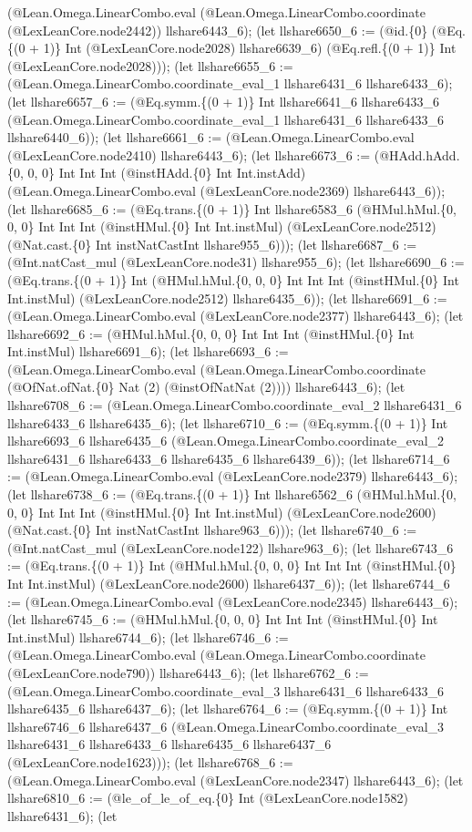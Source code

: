 \documentclass[11pt]{article}
\begin{document}
(@Lean.Omega.LinearCombo.eval (@Lean.Omega.LinearCombo.coordinate (@LexLeanCore.node2442)) llshare6443\_6); (let llshare6650\_6 := (@id.\{0\} (@Eq.\{(0 + 1)\} Int (@LexLeanCore.node2028) llshare6639\_6) (@Eq.refl.\{(0 + 1)\} Int (@LexLeanCore.node2028))); (let llshare6655\_6 := (@Lean.Omega.LinearCombo.coordinate\_eval\_1 llshare6431\_6 llshare6433\_6); (let llshare6657\_6 := (@Eq.symm.\{(0 + 1)\} Int llshare6641\_6 llshare6433\_6 (@Lean.Omega.LinearCombo.coordinate\_eval\_1 llshare6431\_6 llshare6433\_6 llshare6440\_6)); (let llshare6661\_6 := (@Lean.Omega.LinearCombo.eval (@LexLeanCore.node2410) llshare6443\_6); (let llshare6673\_6 := (@HAdd.hAdd.\{0, 0, 0\} Int Int Int (@instHAdd.\{0\} Int Int.instAdd) (@Lean.Omega.LinearCombo.eval (@LexLeanCore.node2369) llshare6443\_6)); (let llshare6685\_6 := (@Eq.trans.\{(0 + 1)\} Int llshare6583\_6 (@HMul.hMul.\{0, 0, 0\} Int Int Int (@instHMul.\{0\} Int Int.instMul) (@LexLeanCore.node2512) (@Nat.cast.\{0\} Int instNatCastInt llshare955\_6))); (let llshare6687\_6 := (@Int.natCast\_mul (@LexLeanCore.node31) llshare955\_6); (let llshare6690\_6 := (@Eq.trans.\{(0 + 1)\} Int (@HMul.hMul.\{0, 0, 0\} Int Int Int (@instHMul.\{0\} Int Int.instMul) (@LexLeanCore.node2512) llshare6435\_6)); (let llshare6691\_6 := (@Lean.Omega.LinearCombo.eval (@LexLeanCore.node2377) llshare6443\_6); (let llshare6692\_6 := (@HMul.hMul.\{0, 0, 0\} Int Int Int (@instHMul.\{0\} Int Int.instMul) llshare6691\_6); (let llshare6693\_6 := (@Lean.Omega.LinearCombo.eval (@Lean.Omega.LinearCombo.coordinate (@OfNat.ofNat.\{0\} Nat (2) (@instOfNatNat (2)))) llshare6443\_6); (let llshare6708\_6 := (@Lean.Omega.LinearCombo.coordinate\_eval\_2 llshare6431\_6 llshare6433\_6 llshare6435\_6); (let llshare6710\_6 := (@Eq.symm.\{(0 + 1)\} Int llshare6693\_6 llshare6435\_6 (@Lean.Omega.LinearCombo.coordinate\_eval\_2 llshare6431\_6 llshare6433\_6 llshare6435\_6 llshare6439\_6)); (let llshare6714\_6 := (@Lean.Omega.LinearCombo.eval (@LexLeanCore.node2379) llshare6443\_6); (let llshare6738\_6 := (@Eq.trans.\{(0 + 1)\} Int llshare6562\_6 (@HMul.hMul.\{0, 0, 0\} Int Int Int (@instHMul.\{0\} Int Int.instMul) (@LexLeanCore.node2600) (@Nat.cast.\{0\} Int instNatCastInt llshare963\_6))); (let llshare6740\_6 := (@Int.natCast\_mul (@LexLeanCore.node122) llshare963\_6); (let llshare6743\_6 := (@Eq.trans.\{(0 + 1)\} Int (@HMul.hMul.\{0, 0, 0\} Int Int Int (@instHMul.\{0\} Int Int.instMul) (@LexLeanCore.node2600) llshare6437\_6)); (let llshare6744\_6 := (@Lean.Omega.LinearCombo.eval (@LexLeanCore.node2345) llshare6443\_6); (let llshare6745\_6 := (@HMul.hMul.\{0, 0, 0\} Int Int Int (@instHMul.\{0\} Int Int.instMul) llshare6744\_6); (let llshare6746\_6 := (@Lean.Omega.LinearCombo.eval (@Lean.Omega.LinearCombo.coordinate (@LexLeanCore.node790)) llshare6443\_6); (let llshare6762\_6 := (@Lean.Omega.LinearCombo.coordinate\_eval\_3 llshare6431\_6 llshare6433\_6 llshare6435\_6 llshare6437\_6); (let llshare6764\_6 := (@Eq.symm.\{(0 + 1)\} Int llshare6746\_6 llshare6437\_6 (@Lean.Omega.LinearCombo.coordinate\_eval\_3 llshare6431\_6 llshare6433\_6 llshare6435\_6 llshare6437\_6 (@LexLeanCore.node1623))); (let llshare6768\_6 := (@Lean.Omega.LinearCombo.eval (@LexLeanCore.node2347) llshare6443\_6); (let llshare6810\_6 := (@le\_of\_le\_of\_eq.\{0\} Int (@LexLeanCore.node1582) llshare6431\_6); (let 
\end{document}
